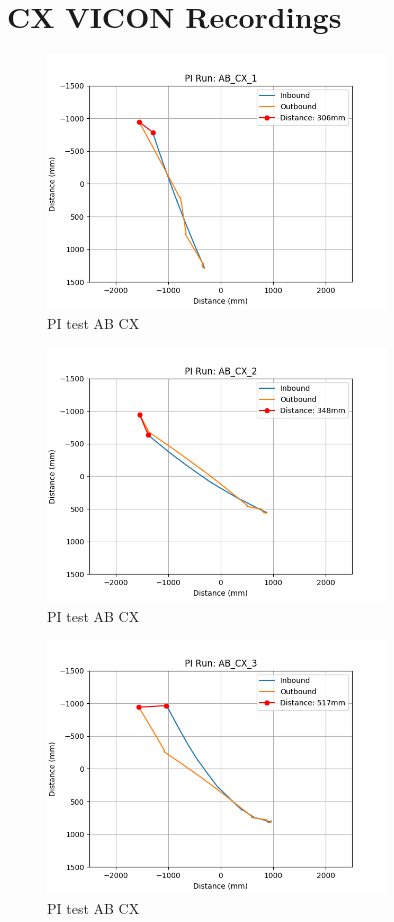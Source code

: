 \documentclass[a4paper,11pt,twoside,openright]{article}
\let\oldsection\section
\def\section{\cleardoublepage\oldsection}
\begin{document}
\section{CX VICON Recordings}\label{ap:cxfigs}
\begin{figure}[h!]
  \centering
  \includegraphics[width=0.8\textwidth]{AB_CX_1}
  \caption{\label{fig:abcx1} PI test AB\textunderscore
    CX}
\end{figure}

\begin{figure}[h!]
  \centering
  \includegraphics[width=0.8\textwidth]{AB_CX_2}
  \caption{\label{fig:abcx2}PI test AB\textunderscore
    CX}
\end{figure}

\begin{figure}[h!]
  \centering
  \includegraphics[width=0.8\textwidth]{AB_CX_3}
  \caption{\label{fig:abcx3}PI test AB\textunderscore
    CX}
\end{figure}
\end{document}
